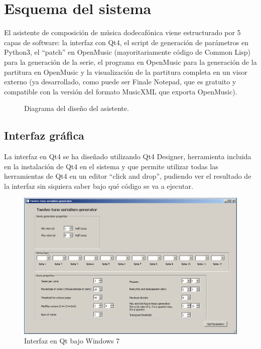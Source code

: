 \documentclass[a4paper,openany,oneside,12pt]{book}
\begin{document}
\section{Esquema del sistema}
El asistente de composición de música dodecafónica viene estructurado por 5 capas de software: la interfaz con Qt4, el script de generación de parámetros en Python3, el ``patch'' en OpenMusic (mayoritariamente código de Common Lisp) para la generación de la serie, el programa en OpenMusic para la generación de la partitura en OpenMusic y la visualización de la partitura completa en un visor externo (ya desarrollado, como puede ser Finale Notepad, que es gratuito y compatible con la versión del formato MusicXML que exporta OpenMusic).

\begin{figure}
\centering
\noindent{}
\caption{Diagrama del diseño del asistente.} \label{fig:softwarediagram}
\end{figure}

\subsection{Interfaz gráfica}

La interfaz en Qt4 se ha diseñado utilizando Qt4 Designer, herramienta incluida en la instalación de Qt4 en el sistema y que permite utilizar todas las herramientas de Qt4 en un editor ``click and drop'', pudiendo ver el resultado de la interfaz sin siquiera saber bajo qué código se va a ejecutar.

\begin{figure}
\centering
\includegraphics[width=\textwidth]{img/qtprogram.png}
\caption{Interfaz en Qt bajo Windows 7} \label{fig:qtinterface}
\end{figure}
\end{document}
